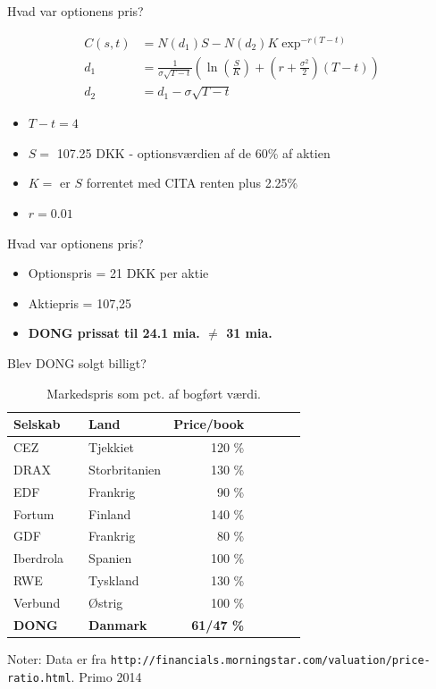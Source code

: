 \documentclass{beamer}
\begin{document}
\begin{frame}{Hvad var optionens pris?}
	
	\begin{align}
C(s,t)&=N(d_1)S-N(d_2)K \exp^{-r(T-t)} \\
d_1&= \frac{1}{\sigma\sqrt{T-t}}\left( \ln\left( \frac{S}{K} \right)+\left(r+\frac{\sigma^2}{2} \right)(T-t) \right) \nonumber \\
d_2&=d_1-\sigma \sqrt{T-t} \nonumber
\end{align}
	\begin{itemize}
		\item $T-t=4$
		\item $S=$ 107.25 DKK - optionsværdien af de 60\% af aktien
	\item $K=$ er $S$ forrentet med CITA renten plus 2.25\%
	\item $r=0.01$
\end{itemize}

\end{frame}

\begin{frame}{Hvad var optionens pris?}

\begin{itemize}
	\item Optionspris = 21 DKK per aktie
	\item Aktiepris = 107,25
	\item \textbf{DONG  prissat til 24.1 mia. $\neq$ 31 mia.}
\end{itemize}
	
\end{frame}

\begin{frame}{Blev DONG solgt billigt?}
\begin{table}[h]
	\caption{Markedspris som pct. af bogført værdi.}
	\label{tab:bookval}
	\begin{tabularx}{\linewidth}{lXlrcccr}
	\toprule[1pt]
	Selskab && Land & Price/book \\
	\hline 
		CEZ && Tjekkiet &  120 \% \\
		DRAX && Storbritanien &  130 \% \\
		EDF && Frankrig &  90 \%  \\
		Fortum && Finland &  140 \% \\
		GDF && Frankrig &  80 \% \\
		Iberdrola && Spanien &  100 \% \\
		RWE &&  Tyskland &  130 \% \\
		Verbund && Østrig &  100 \% \\
		\textbf{DONG} && \textbf{Danmark} & \textbf{61/47 \%} \\
		\bottomrule[1pt]
	\end{tabularx}
	\begin{minipage}{\linewidth}
		\footnotesize{Noter: Data er fra \texttt{http://financials.morningstar.com/valuation/price-ratio.html}. Primo 2014}
	\end{minipage}
\end{table}
\end{frame}
\end{document}
